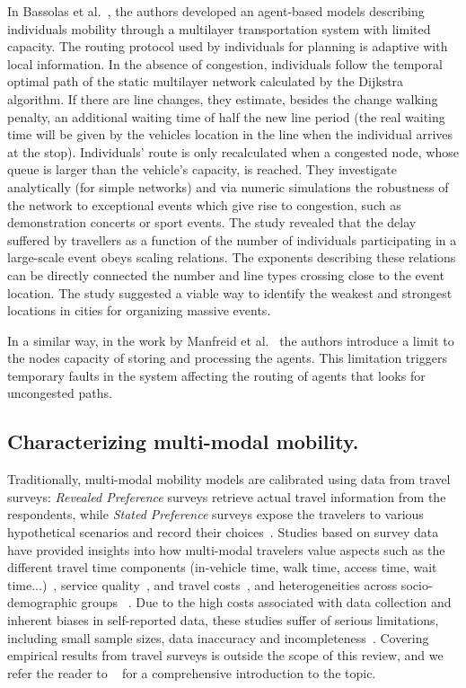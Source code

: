 In Bassolas et al.~\cite{bassolas2020scaling}, the authors developed an agent-based models describing individuals mobility through a multilayer transportation system with limited capacity. The routing protocol used by individuals for planning is adaptive with local information. In the absence of congestion, individuals follow the temporal optimal path of the static multilayer network calculated by the Dijkstra algorithm. If there are line changes, they estimate, besides the change walking penalty, an additional waiting time of half the new line period (the real waiting time will be given by the vehicles location in the line when the individual arrives at the stop). Individuals’ route is only recalculated when a congested node, whose queue is larger than the vehicle’s capacity, is reached. They investigate analytically (for simple networks) and via numeric simulations the robustness of the network to exceptional events which give rise to congestion, such as demonstration concerts or sport events. The study revealed that the delay suffered by travellers as a function of the number of individuals participating in a large-scale event obeys scaling relations. The exponents describing these relations can be directly connected the number and line types crossing close to the event location. The study suggested a viable way to identify the weakest and strongest locations in cities for organizing massive events.

In a similar way, in the work by Manfreid et al.~\cite{manfredi2018congestion} the authors introduce a limit to the nodes capacity of storing and processing the agents. This limitation triggers temporary faults in the system affecting the routing of agents that looks for uncongested paths. 


\subsection{Characterizing multi-modal mobility. \label{mobility_2}}
Traditionally, multi-modal mobility models are calibrated using data from travel surveys: \emph{Revealed Preference} surveys retrieve actual travel information from the respondents, while \emph{Stated Preference} surveys expose the travelers to various hypothetical scenarios and record their choices~\cite{arentze2013travelers}. Studies based on survey data have provided insights into how multi-modal travelers value aspects such as the different travel time components (in-vehicle time, walk time, access time, wait time...)~\cite{abrantes2011meta}, service quality~\cite{wardman2001review}, and travel costs~\cite{arentze2013travelers}, and heterogeneities across socio-demographic groups ~\cite{nobis2007multimodality}. Due to the high costs associated with data collection and inherent biases in self-reported data, these studies suffer of serious limitations, including small sample sizes, data inaccuracy and incompleteness~\cite{chen2016promises,zannat2019emerging}. Covering empirical results from travel surveys is outside the scope of this review, and we refer the reader to ~\cite{arentze2013travelers} for a comprehensive introduction to the topic.

